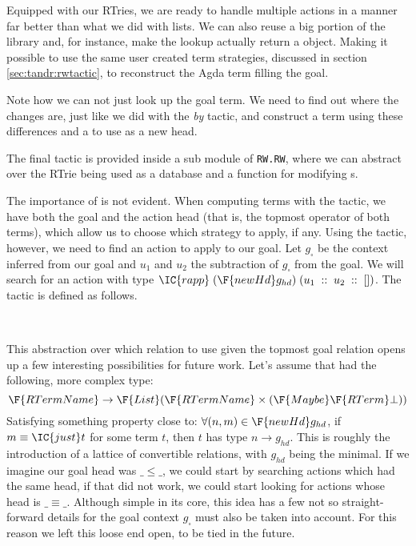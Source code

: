Equipped with our RTries, we are ready to handle multiple actions in a manner far better
than what we did with lists. We can also reuse a big portion of the library and,
for instance, make the lookup actually return a  object. Making
it possible to use the same user created term strategies, discussed in section \ref{sec:tandr:rwtactic},
to reconstruct the Agda term filling the goal.


Note how we can not just look up the goal term. We need to find out where the changes are,
just like we did with the \emph{by} tactic, and construct a term using these differences
and a  to use as a new head.

The final tactic is provided inside a sub module of \texttt{\small RW.RW}, where
we can abstract over the RTrie being used as a database and a function for modifying
s.


The importance of  is not evident. When computing terms with the  tactic,
we have both the goal and the action head (that is, the topmost operator of both terms),
which allow us to choose which strategy to apply, if any. Using the  tactic, however,
we need to find an action to apply to our goal. Let $g_\square$ be the context inferred from
our goal and $u_1$ and $u_2$ the subtraction of $g_\square$ from the goal. We will search
for an action with type $\IC{rapp}\; (\F{newHd }g_{hd})\;(u_1\;::\;u_2\;::\;[])$. The tactic is defined as follows.

\\

This abstraction over which relation to use given the topmost goal relation opens up a few interesting
possibilities for future work. Let's assume that  had the following, more complex type: 
\[
\F{RTermName} \rightarrow \F{List }(\F{RTermName} \times (\F{Maybe }\F{RTerm }\bot))
\]
Satisfying something property close to: $\forall (n , m) \in \F{newHd }g_{hd}$, if $m \equiv \IC{just }t$
for some term $t$, then $t$ has type $n \rightarrow g_{hd}$. This is roughly the introduction
of a lattice of convertible relations, with $g_{hd}$ being the minimal. If we imagine
our goal head was $\_\leq\_$, we could start by searching actions which had the same head,
if that did not work, we could start looking for actions whose head is $\_\equiv\_$. Although
simple in its core, this idea has a few not so straight-forward details for the goal context $g_\square$
must also be taken into account. For this reason we left this loose end open, to be tied in the future.

